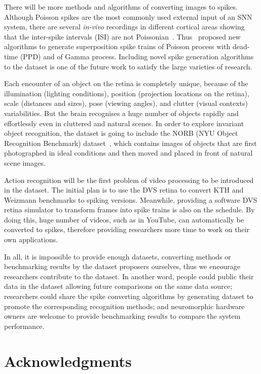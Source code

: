 \documentclass{frontiersENG} %
\begin{document}
There will be more methods and algorithms of converting images to spikes.
Although Poisson spikes are the most commonly used external input of an SNN system, there are several \textit{in-vivo} recordings in different cortical areas showing that the inter-spike intervals (ISI) are not Poissonian~\citep{deger2012statistical}. 
Thus~\citet{deger2012statistical} proposed new algorithms to generate superposition spike trains of Poisson process with dead-time (PPD) and of Gamma process.
Including novel spike generation algorithms to the dataset is one of the future work to satisfy the large varieties of research.

Each encounter of an object on the retina is completely unique, because of the illumination (lighting conditions), position (projection locations on the retina), scale (distances and sizes), pose (viewing angles), and clutter (visual contexts) variabilities.
But the brain recognises a huge number of objects rapidly and effortlessly even in cluttered and natural scenes.
In order to explore invariant object recognition, the dataset is going to include the NORB (NYU Object Recognition Benchmark) dataset~\citep{lecun2004learning}, which contains images of objects that are first photographed in ideal conditions and then moved and placed in front of natural scene images.

Action recognition will be the first problem of video processing to be introduced in the dataset.
The initial plan is to use the DVS retina to convert KTH and Weizmann benchmarks to spiking versions.
Meanwhile, providing a software DVS retina simulator to transform  frames into spike trains is also on the schedule.
By doing this, huge number of videos, such as in YouTube, can automatically be converted to spikes, therefore providing researchers more time to work on their own applications.

In all, it is impossible to provide enough datasets, converting methods or benchmarking results by the dataset proposers ourselves, thus we encourage researchers contribute to the dataset.
In another word, people could public their data in the dataset allowing future comparisons on the same data source;
researchers could share the spike converting algorithms by generating dataset to promote the corresponding recognition methods;
and neuromorphic hardware owners are welcome to provide benchmarking results to compare the system performance.

\section*{Acknowledgments}
\end{document}
